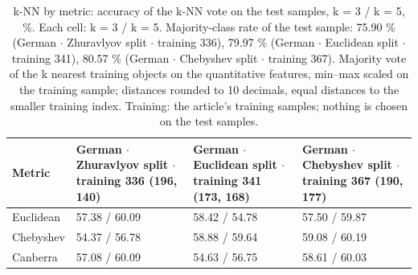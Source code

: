 \begin{table}[htbp]
  \centering
  \caption{k-NN by metric: accuracy of the k-NN vote on the test samples, k = 3 / k = 5, \%. Each cell: k = 3 / k = 5. Majority-class rate of the test sample: 75.90 \% (German $\cdot$ Zhuravlyov split $\cdot$ training 336), 79.97 \% (German $\cdot$ Euclidean split $\cdot$ training 341), 80.57 \% (German $\cdot$ Chebyshev split $\cdot$ training 367). Majority vote of the k nearest training objects on the quantitative features, min--max scaled on the training sample; distances rounded to 10 decimals, equal distances to the smaller training index. Training: the article's training samples; nothing is chosen on the test samples.}
  \label{tab:knn-by-metric}
  \begin{tabular}{llll}
    \toprule
    Metric & German $\cdot$ Zhuravlyov split $\cdot$ training 336 (196, 140) & German $\cdot$ Euclidean split $\cdot$ training 341 (173, 168) & German $\cdot$ Chebyshev split $\cdot$ training 367 (190, 177) \\
    \midrule
    Euclidean & 57.38 / 60.09 & 58.42 / 54.78 & 57.50 / 59.87 \\
    Chebyshev & 54.37 / 56.78 & 58.88 / 59.64 & 59.08 / 60.19 \\
    Canberra & 57.08 / 60.09 & 54.63 / 56.75 & 58.61 / 60.03 \\
    \bottomrule
  \end{tabular}
\end{table}
